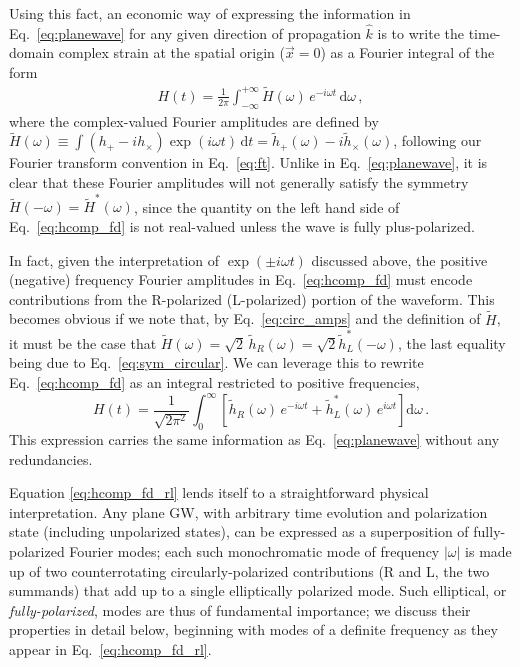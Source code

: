 \documentclass[aps,prd,twocolumn,superscriptaddress,preprintnumbers,floatfix,nofootinbib]{revtex4-2}
\newcommand*{\eq}[1]{Eq.~\eqref{eq:#1}}
\newcommand{\infd}{\mathrm{d}}
\begin{document}
Using this fact, an economic way of expressing the information in Eq.~\eqref{eq:planewave} for any given direction of propagation $\hat{k}$ is to write the time-domain complex strain at the spatial origin ($\vec{x}=0$) as a Fourier integral of the form
\begin{align} \label{eq:hcomp_fd}
H(t) = \frac{1}{2\pi} \int_{-\infty}^{+\infty} \tilde{H}(\omega)\, e^{-i \omega t} \,\infd \omega \, ,
\end{align}
where the complex-valued Fourier amplitudes are defined by $\tilde{H}(\omega) \equiv \int (h_+ - i h_\times) \exp(i\omega t)\, \infd t = \tilde{h}_+(\omega) - i \tilde{h}_\times(\omega)$, following our Fourier transform convention in Eq.~\eqref{eq:ft}.
Unlike in Eq.~\eqref{eq:planewave}, it is clear that these Fourier amplitudes will not generally satisfy the symmetry $\tilde{H}(-\omega) = \tilde{H}^*(\omega)$, since the quantity on the left hand side of Eq.~\eqref{eq:hcomp_fd} is not real-valued unless the wave is fully plus-polarized.

In fact, given the interpretation of $\exp(\pm i \omega t)$ discussed above, the positive (negative) frequency Fourier amplitudes in Eq.~\eqref{eq:hcomp_fd} must encode contributions from the R-polarized (L-polarized) portion of the waveform.
This becomes obvious if we note that, by Eq.~\eqref{eq:circ_amps} and the definition of $\tilde{H}$, it must be the case that $\tilde{H}(\omega) = \sqrt{2}\, \tilde{h}_R (\omega) = \sqrt{2} \tilde{h}_L^*(-\omega)$, the last equality being due to Eq.~\eqref{eq:sym_circular}.
We can leverage this to rewrite Eq.~\eqref{eq:hcomp_fd} as an integral restricted to positive frequencies,
\begin{equation} \label{eq:hcomp_fd_rl}
H(t) = \frac{1}{\sqrt{2\pi^2}} \int_{0}^{\infty} \left[ \tilde{h}_R(\omega)\, e^{-i \omega t} + \tilde{h}_L^*(\omega)\, e^{i \omega t}\right] \infd \omega \, .
\end{equation}
This expression carries the same information as Eq.~\eqref{eq:planewave} without any redundancies.

Equation \eqref{eq:hcomp_fd_rl} lends itself to a straightforward physical interpretation.
Any plane GW, with arbitrary time evolution and polarization state (including unpolarized states), can be expressed as a superposition of fully-polarized Fourier modes;
each such monochromatic mode of frequency $|\omega|$ is made up of two counterrotating circularly-polarized contributions (R and L, the two summands) that add up to a single elliptically polarized mode.
Such elliptical, or \emph{fully-polarized}, modes are thus of fundamental importance; we discuss their properties in detail below, beginning with modes of a definite frequency as they appear in \eq{hcomp_fd_rl}.
\end{document}
